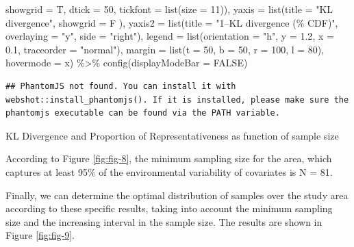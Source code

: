 \documentclass[
  10pt,
  b5paper,
  oneside]{book}
\newenvironment{Shaded}{\begin{snugshade}}{\end{snugshade}}
\newcommand{\AttributeTok}[1]{\textcolor[rgb]{0.77,0.63,0.00}{#1}}
\newcommand{\ConstantTok}[1]{\textcolor[rgb]{0.00,0.00,0.00}{#1}}
\newcommand{\DecValTok}[1]{\textcolor[rgb]{0.00,0.00,0.81}{#1}}
\newcommand{\FloatTok}[1]{\textcolor[rgb]{0.00,0.00,0.81}{#1}}
\newcommand{\FunctionTok}[1]{\textcolor[rgb]{0.00,0.00,0.00}{#1}}
\newcommand{\NormalTok}[1]{#1}
\newcommand{\SpecialCharTok}[1]{\textcolor[rgb]{0.00,0.00,0.00}{#1}}
\newcommand{\StringTok}[1]{\textcolor[rgb]{0.31,0.60,0.02}{#1}}
\begin{document}
\begin{Shaded}
\begin{Highlighting}[]
                        \AttributeTok{showgrid =}\NormalTok{ T, }
                        \AttributeTok{dtick =} \DecValTok{50}\NormalTok{, }
                        \AttributeTok{tickfont =} \FunctionTok{list}\NormalTok{(}\AttributeTok{size =} \DecValTok{11}\NormalTok{)),}
           \AttributeTok{yaxis =} \FunctionTok{list}\NormalTok{(}\AttributeTok{title =} \StringTok{"KL divergence"}\NormalTok{, }\AttributeTok{showgrid =}\NormalTok{ F ),}
           \AttributeTok{yaxis2 =} \FunctionTok{list}\NormalTok{(}\AttributeTok{title =} \StringTok{"1–KL divergence (\% CDF)"}\NormalTok{,}
                         \AttributeTok{overlaying =} \StringTok{"y"}\NormalTok{, }\AttributeTok{side =} \StringTok{"right"}\NormalTok{),}
           \AttributeTok{legend =} \FunctionTok{list}\NormalTok{(}\AttributeTok{orientation =} \StringTok{"h"}\NormalTok{, }\AttributeTok{y =} \FloatTok{1.2}\NormalTok{, }\AttributeTok{x =} \FloatTok{0.1}\NormalTok{,}
                         \AttributeTok{traceorder =} \StringTok{"normal"}\NormalTok{),}
           \AttributeTok{margin =} \FunctionTok{list}\NormalTok{(}\AttributeTok{t =} \DecValTok{50}\NormalTok{, }\AttributeTok{b =} \DecValTok{50}\NormalTok{, }\AttributeTok{r =} \DecValTok{100}\NormalTok{, }\AttributeTok{l =} \DecValTok{80}\NormalTok{),}
           \AttributeTok{hovermode =} \StringTok{\textquotesingle{}x\textquotesingle{}}\NormalTok{)  }\SpecialCharTok{\%\textgreater{}\%} 
    \FunctionTok{config}\NormalTok{(}\AttributeTok{displayModeBar =} \ConstantTok{FALSE}\NormalTok{) }
\end{Highlighting}
\end{Shaded}

\begin{verbatim}
## PhantomJS not found. You can install it with webshot::install_phantomjs(). If it is installed, please make sure the phantomjs executable can be found via the PATH variable.
\end{verbatim}

\label{fig:fig-8}KL Divergence and Proportion of Representativeness as function of sample size

According to Figure \ref{fig:fig-8}, the minimum sampling size for the area, which captures at least 95\% of the environmental variability of covariates is N = 81.

Finally, we can determine the optimal distribution of samples over the study area according to these specific results, taking into account the minimum sampling size and the increasing interval in the sample size. The results are shown in Figure \ref{fig:fig-9}.
\end{document}
